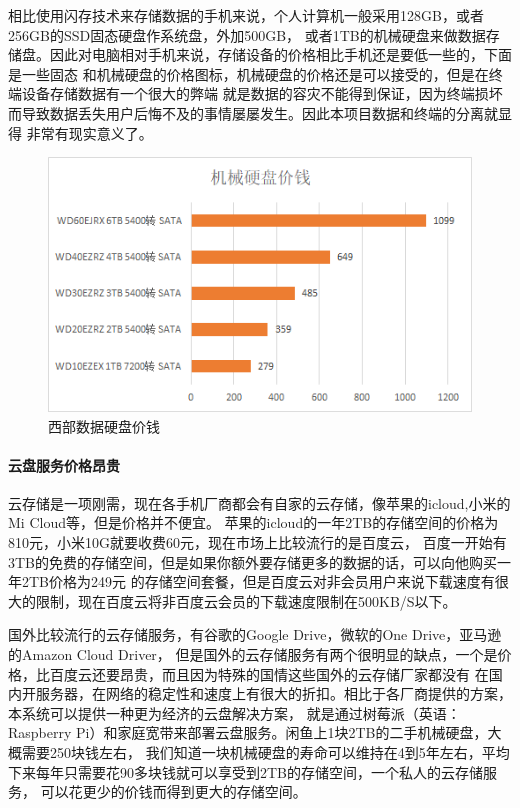 相比使用闪存技术来存储数据的手机来说，个人计算机一般采用128GB，或者256GB的SSD固态硬盘作系统盘，外加500GB，
或者1TB的机械硬盘来做数据存储盘。因此对电脑相对手机来说，存储设备的价格相比手机还是要低一些的，下面是一些固态
和机械硬盘的价格图标，机械硬盘的价格还是可以接受的，但是在终端设备存储数据有一个很大的弊端
就是数据的容灾不能得到保证，因为终端损坏而导致数据丢失用户后悔不及的事情屡屡发生。因此本项目数据和终端的分离就显得
非常有现实意义了。

\begin{figure}[H]
  \centering
  \includegraphics[width=130mm]{./figures/raid2.png}
  \caption{ 西部数据硬盘价钱\cite{r19}}
\end{figure}

\paragraph{云盘服务价格昂贵}
云存储是一项刚需，现在各手机厂商都会有自家的云存储，像苹果的icloud,小米的Mi Cloud等，但是价格并不便宜。
苹果的icloud的一年2TB的存储空间的价格为810元\cite{r22}，小米10G就要收费60元，现在市场上比较流行的是百度云，
百度一开始有3TB的免费的存储空间，但是如果你额外要存储更多的数据的话，可以向他购买一年2TB价格为249元
的存储空间套餐，但是百度云对非会员用户来说下载速度有很大的限制，现在百度云将非百度云会员的下载速度限制在500KB/S以下。

国外比较流行的云存储服务，有谷歌的Google Drive，微软的One Drive，亚马逊的Amazon Cloud Driver，
但是国外的云存储服务有两个很明显的缺点，一个是价格，比百度云还要昂贵，而且因为特殊的国情这些国外的云存储厂家都没有
在国内开服务器，在网络的稳定性和速度上有很大的折扣\cite{r11,r12,r13,r14}。相比于各厂商提供的方案，本系统可以提供一种更为经济的云盘解决方案，
就是通过树莓派（英语：Raspberry Pi）和家庭宽带来部署云盘服务。闲鱼上1块2TB的二手机械硬盘，大概需要250块钱左右，
我们知道一块机械硬盘的寿命可以维持在4到5年左右，平均下来每年只需要花90多块钱就可以享受到2TB的存储空间，一个私人的云存储服务，
可以花更少的价钱而得到更大的存储空间。


